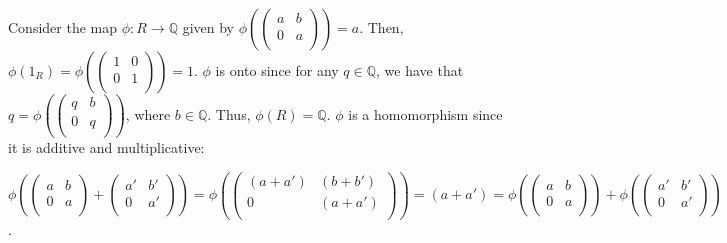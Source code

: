 Consider the map $\phi: R \rightarrow \mathbb{Q}$ given by $\phi(\left(%
    \begin{array}{cc}
      a & b \\
      0 & a \\
    \end{array}%
    \right)) = a$. Then, $\phi(1_R) = \phi(\left(%
    \begin{array}{cc}
      1 & 0 \\
      0 & 1 \\
    \end{array}%
    \right)) = 1$. $\phi$ is onto since for any $q \in \mathbb{Q}$, we have that $q = \phi(\left(%
    \begin{array}{cc}
      q & b \\
      0 & q \\
    \end{array}%
    \right))$, where $b \in \mathbb{Q}$. Thus, $\phi(R) = \mathbb{Q}$. $\phi$ is a homomorphism since it is additive and multiplicative:
    
    $\phi(\left(%
    \begin{array}{cc}
      a & b \\
      0 & a \\
    \end{array}%
    \right) + \left(%
    \begin{array}{cc}
      a' & b' \\
      0 & a' \\
    \end{array}%
    \right)) = \phi(\left(%
    \begin{array}{cc}
      (a+a') & (b+b') \\
      0 & (a+a') \\
    \end{array}%
    \right)) = (a+a') = \phi(\left(%
    \begin{array}{cc}
      a & b \\
      0 & a \\
    \end{array}%
    \right)) + \phi(\left(%
    \begin{array}{cc}
      a' & b' \\
      0 & a' \\
    \end{array}%
    \right))$.
    
